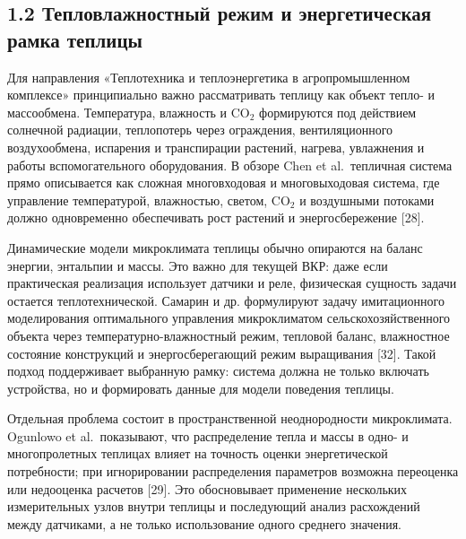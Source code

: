 \documentclass[a4paper,14pt]{extarticle}
\begin{document}
\hypertarget{ux442ux435ux43fux43bux43eux432ux43bux430ux436ux43dux43eux441ux442ux43dux44bux439-ux440ux435ux436ux438ux43c-ux438-ux44dux43dux435ux440ux433ux435ux442ux438ux447ux435ux441ux43aux430ux44f-ux440ux430ux43cux43aux430-ux442ux435ux43fux43bux438ux446ux44b}{%
\subsection{1.2 Тепловлажностный режим и энергетическая рамка
теплицы}\label{ux442ux435ux43fux43bux43eux432ux43bux430ux436ux43dux43eux441ux442ux43dux44bux439-ux440ux435ux436ux438ux43c-ux438-ux44dux43dux435ux440ux433ux435ux442ux438ux447ux435ux441ux43aux430ux44f-ux440ux430ux43cux43aux430-ux442ux435ux43fux43bux438ux446ux44b}}

Для направления «Теплотехника и теплоэнергетика в агропромышленном
комплексе» принципиально важно рассматривать теплицу как объект тепло- и
массообмена. Температура, влажность и CO\(_2\) формируются под действием
солнечной радиации, теплопотерь через ограждения, вентиляционного
воздухообмена, испарения и транспирации растений, нагрева, увлажнения и
работы вспомогательного оборудования. В обзоре Chen et al.~тепличная
система прямо описывается как сложная многовходовая и многовыходовая
система, где управление температурой, влажностью, светом, CO\(_2\) и
воздушными потоками должно одновременно обеспечивать рост растений и
энергосбережение {[}28{]}.

Динамические модели микроклимата теплицы обычно опираются на баланс
энергии, энтальпии и массы. Это важно для текущей ВКР: даже если
практическая реализация использует датчики и реле, физическая сущность
задачи остается теплотехнической. Самарин и др. формулируют задачу
имитационного моделирования оптимального управления микроклиматом
сельскохозяйственного объекта через температурно-влажностный режим,
тепловой баланс, влажностное состояние конструкций и энергосберегающий
режим выращивания {[}32{]}. Такой подход поддерживает выбранную рамку:
система должна не только включать устройства, но и формировать данные
для модели поведения теплицы.

Отдельная проблема состоит в пространственной неоднородности
микроклимата. Ogunlowo et al.~показывают, что распределение тепла и
массы в одно- и многопролетных теплицах влияет на точность оценки
энергетической потребности; при игнорировании распределения параметров
возможна переоценка или недооценка расчетов {[}29{]}. Это обосновывает
применение нескольких измерительных узлов внутри теплицы и последующий
анализ расхождений между датчиками, а не только использование одного
среднего значения.
\end{document}
